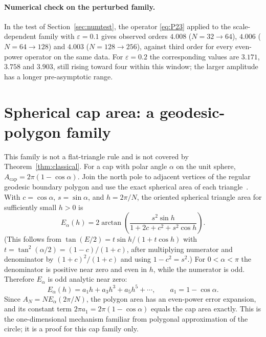 \documentclass[11pt]{article}
\theoremstyle{remark}
\begin{document}
\paragraph{Numerical check on the perturbed family.}
In the test of Section~\ref{sec:numtest}, the operator \eqref{eq:P23} applied to the
scale-dependent family with $\varepsilon=0.1$ gives observed orders $4.008$ ($N=32\to64$),
$4.006$ ($N=64\to128$) and $4.003$ ($N=128\to256$), against third order for every even-power operator on the same data.
For $\varepsilon=0.2$ the corresponding values are $3.171$, $3.758$ and $3.903$, still rising
toward four within this window; the larger amplitude has a longer pre-asymptotic range.

\section{Spherical cap area: a geodesic-polygon family}\label{sec:cap}
This family is not a flat-triangle rule and is not covered by Theorem~\ref{thm:classical}.
For a cap with polar angle $\alpha$ on the unit sphere, $A_{\mathrm{cap}}=2\pi(1-\cos\alpha)$.
Join the north pole to adjacent vertices of the regular geodesic boundary polygon and use the
exact spherical area of each triangle~\cite{todhunter}. With $c=\cos\alpha$, $s=\sin\alpha$,
and $h=2\pi/N$, the oriented spherical triangle area for sufficiently small $h>0$ is
\begin{equation}\label{eq:E}
E_\alpha(h)=2\arctan\!\left(\frac{s^{2}\sin h}{1+2c+c^{2}+s^{2}\cos h}\right).
\end{equation}
(This follows from $\tan(E/2)=t\sin h/(1+t\cos h)$ with $t=\tan^2(\alpha/2)=(1-c)/(1+c)$,
after multiplying numerator and denominator by $(1+c)^2/(1+c)$ and using $1-c^2=s^2$.)
For $0<\alpha<\pi$ the denominator is positive near zero and even in $h$, while the numerator
is odd. Therefore $E_\alpha$ is odd analytic near zero:
\[
E_\alpha(h)=a_1h+a_3h^3+a_5h^5+\cdots,\qquad a_1=1-\cos\alpha .
\]
Since $A_N=NE_\alpha(2\pi/N)$, the polygon area has an even-power error expansion, and its
constant term $2\pi a_1=2\pi(1-\cos\alpha)$ equals the cap area exactly. This is the
one-dimensional mechanism familiar from polygonal approximation of the circle; it is a proof
for this cap family only.
\end{document}
